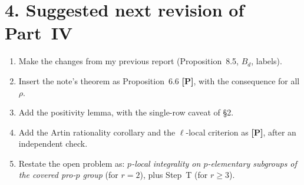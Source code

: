 \documentclass[11pt]{article}
\theoremstyle{plain}
\begin{document}
\section*{4. Suggested next revision of Part~IV}
\begin{enumerate}[label=(\arabic*)]
\item Make the changes from my previous report (Proposition~8.5, $B_d$,
labels).
\item Insert the note's theorem as Proposition~6.6 \textbf{[P]}, with the
consequence for all $\rho$.
\item Add the positivity lemma, with the single-row caveat of \S2.
\item Add the Artin rationality corollary and the $\ell$-local
criterion as \textbf{[P]}, after an independent check.
\item Restate the open problem as: \emph{$p$-local integrality on
$p$-elementary subgroups of the covered pro-$p$ group} (for $r=2$), plus
Step~T (for $r\ge3$).
\end{enumerate}
\end{document}
